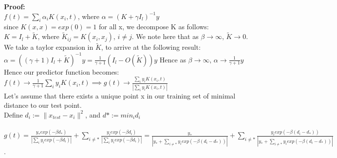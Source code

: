 \documentclass[12pt]{article}
\begin{document}
\begin{enumerate}[leftmargin=\labelsep]
    \textbf{Proof:}\\
    
    $f(t) = \sum_{i} \alpha_{i} K(x_{i}, t)$, where $ \alpha = (K + \gamma I_{l})^{-1} y$\\
    
    since $K(x,x) = exp(0) = 1$ for  all x, we decompose K as follows:\\
    
    $K = I_{l} + \tilde{K}$, where $\tilde{K}_{ij} = K(x_i, x_j)$, $i \ne j$. We note here that as $\beta \to \infty$, $ \tilde{K} \to 0$.\\
    
    We take a taylor expansion in $\tilde{K}$, to arrive at the following result:\\
    
    $\alpha = ((\gamma+1) I_{l} + \tilde{K})^{-1} y = \frac{1}{\gamma + 1} (I_{l} - O(\tilde{K})) y $
    Hence as $\beta \to \infty$, $\alpha \to \frac{1}{\gamma +1}y$\\
    Hence our predictor function becomes:\\
    $f(t) \to \frac{1}{\gamma+1} \sum_{i} y_{i} K(x_{i}, t) \implies g(t)  \to \frac{\sum_{i} y_{i} K(x_{i}, t)}{|\sum_{i} y_{i} K(x_{i}, t)|}
    $\\

    Let's assume that there exists a unique point x in our training set of minimal distance to our test point.\\
    
    Define $d_{i} := \|x_{test} - x_{i}\|^{2}$, and $d* := min_{i} d_{i}$\\
    \\
    $g(t) = \frac{y_{*} exp(-\beta d_{*})}{|\sum_{i} y_{i} exp(-\beta d_{i})|} + \sum_{i\ne *}\frac{y_{i} exp(-\beta d_{i})}{|\sum_{i} y_{i} exp(-\beta 
    d_{i})|} = \frac{y_{*}}{|y_{*} + \sum_{i \ne *} y_{i} exp(-\beta (d_{i} - d_{*}))|} + \sum_{i\ne *}\frac{y_{i} exp(-\beta (d_{i} - d_{*}))}{|y_{*} + \sum_{i \ne *} y_{i} exp(-\beta (d_{i} - d_{*}))|}$.\\
    

\end{enumerate}
\end{document}
